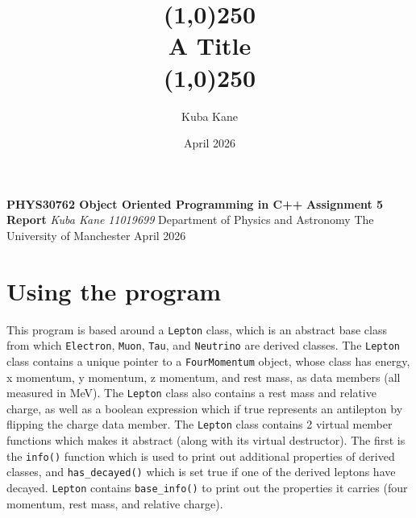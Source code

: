 \documentclass[11pt, letterpaper]{article}
\title{\line(1,0){250}\\A Title\\\line(1,0){250}}
\author{Kuba Kane}
\date{April 2026}
\begin{document}
\begin{titlepage}
    \begin{center}
        \vspace*{1.5cm}

        \normalsize \textbf{PHYS30762 Object Oriented Programming in C++}
        \vspace{0.5cm}
        \linebreak \Large \textbf{Assignment 5 Report}
        \vspace{2cm}
        \linebreak \normalsize \textit{} 
        \linebreak \textit{Kuba Kane}
	\linebreak \textit{11019699}
        \vspace{12pt}
        \vspace{12pt}
        \linebreak Department of Physics and Astronomy
        \linebreak The University of Manchester
        \vspace{12pt}
        \vspace{12pt}
        \linebreak April 2026
        \vspace{\fill}
        \tableofcontents
    \end{center}
    \vspace{3cm}
    
\end{titlepage}

\newpage
\vspace{5pt}
\noindent{}
\vspace{5pt}

\section{Using the program}
This program is based around a \verb|Lepton| class, which is an abstract base class from which \verb|Electron|, \verb|Muon|, \verb|Tau|, and \verb|Neutrino| are derived classes. The \verb|Lepton| class contains a unique pointer to a \verb|FourMomentum| object, whose class has energy, x momentum, y momentum, z momentum, and rest mass, as data members (all measured in MeV). The \verb|Lepton| class also contains a rest mass and relative charge, as well as a boolean expression which if true represents an antilepton by flipping the charge data member. The \verb|Lepton| class contains 2 virtual member functions which makes it abstract (along with its virtual destructor). The first is the \verb|info()| function which is used to print out additional properties of derived classes, and \verb|has_decayed()| which is set true if one of the derived leptons have decayed. \verb|Lepton| contains \verb|base_info()| to print out the properties it carries (four momentum, rest mass, and relative charge).
\end{document}
